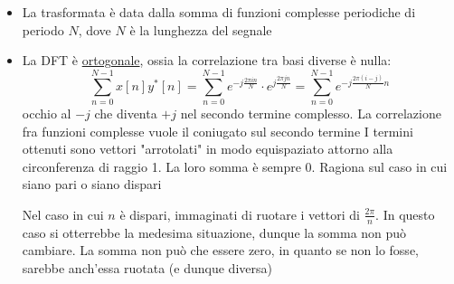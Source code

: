 \begin{itemize}
	\item La trasformata è data dalla somma di funzioni complesse periodiche di periodo $ N $, dove $ N $ è la lunghezza del segnale
	\item La  DFT è \underline{ortogonale}, ossia la correlazione tra basi diverse è nulla:
	      \[
		      \sum_{n=0}^{N-1} x\left[n\right] y^{*}\left[n\right] = \sum_{n=0}^{N-1} e^{-j \frac{2\pi i n}{N}} \cdot e^{j \frac{2\pi j n}{N}} = \sum_{n=0}^{N-1} e^{-j \frac{2 \pi\left(i - j\right)}{N} n}
	      \]
	      occhio al $ -j $ che diventa $ +j $ nel secondo termine complesso. La correlazione fra funzioni complesse vuole il coniugato sul secondo termine
	      \vskip3mm
	      I termini ottenuti sono vettori "arrotolati" in modo equispaziato attorno alla circonferenza di raggio 1. La loro somma è sempre $ 0 $. Ragiona sul caso in cui siano pari o siano dispari

	      \begin{minipage}[t]{0.48\textwidth}
	      \end{minipage}
	      \begin{minipage}[t]{0.48\textwidth}
	      \end{minipage}

	      Nel caso in cui $ n $ è dispari, immaginati di ruotare i vettori di $ \frac{2 \pi }{n} $. In questo caso si otterrebbe la medesima situazione, dunque la somma non può cambiare. La somma non può che essere zero, in quanto se non lo fosse, sarebbe anch'essa ruotata (e dunque diversa)
\end{itemize}
